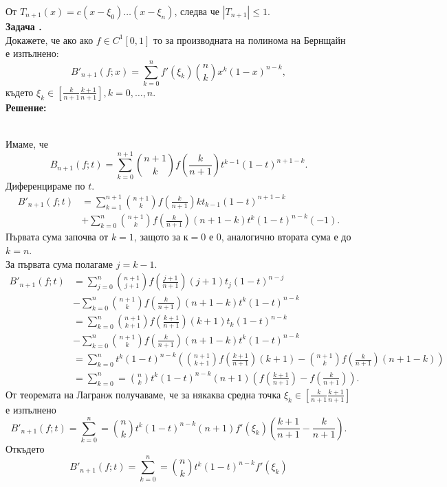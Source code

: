 \documentclass[12pt]{article}
\newcounter{problem}
\newcounter{solution}
\newcommand\problem{%
  \stepcounter{problem}%
  \textbf{Задача \theproblem.}~%
  \\
}
\newcommand\solution{%
  \textbf{Решение:}\\~%
}
\begin{document}
От $T_{n+1}(x)=c(x-\xi_0)\ldots(x-\xi_n)$, следва че $|T_{n+1}|\leq 1$.\\
\problem
Докажете, че ако ако $f\in C^1[0,1]$ то за производната на полинома на Бернщайн е изпълнено:
\begin{equation*}
B'_{n+1}(f;x)=\sum_{k=0}^{n}f'(\xi_k){n\choose k}x^k(1-x)^{n-k},
\end{equation*}
където $\xi_k\in\left[\frac{k}{n+1}\frac{k+1}{n+1}\right], k=0,\ldots,n$.\\
\solution
Имаме, че 
\begin{equation*}
B_{n+1}(f;t)=\sum_{k=0}^{n+1}{n+1 \choose k} f\left(\frac{k}{n+1}\right)  t^{k-1}(1-t)^{n+1-k}.
\end{equation*}
Диференцираме по $t$.
\begin{align*}
B'_{n+1}(f;t) &= \sum_{k=1}^{n+1}{n+1 \choose k} f\left(\frac{k}{n+1}\right)kt_{k-1}(1-t)^{n+1-k} \\&+ \sum_{k=0}^{n}{n+1 \choose k} f\left(\frac{k}{n+1}\right)(n+1-k)t^k(1-t)^{n-k}(-1).
\end{align*}
Първата сума започва от $k=1$, защото за $к=0$ е 0, аналогично втората сума е до $k=n$.\\
За първата сума полагаме $j = k-1$.
\begin{align*}
B'_{n+1}(f;t) &= \sum_{j=0}^{n}{n+1 \choose j+1} f\left(\frac{j+1}{n+1}\right)(j+1)t_{j}(1-t)^{n-j} \\&- \sum_{k=0}^{n}{n+1 \choose k} f\left(\frac{k}{n+1}\right)(n+1-k)t^k(1-t)^{n-k} \\&=\sum_{k=0}^{n}{n+1 \choose k+1} f\left(\frac{k+1}{n+1}\right)(k+1)t_{k}(1-t)^{n-k} \\&- \sum_{k=0}^{n}{n+1 \choose k} f\left(\frac{k}{n+1}\right)(n+1-k)t^k(1-t)^{n-k} \\&=\sum_{k=0}^{n}t^k(1-t)^{n-k}\left({n+1 \choose k+1} f\left(\frac{k+1}{n+1}\right)(k+1)-{n+1 \choose k} f\left(\frac{k}{n+1}\right)(n+1-k)\right)\\&=\sum_{k=0}^n={n \choose k} t^k (1-t)^{n-k} (n+1)\left(f\left(\frac{k+1}{n+1}\right)-f\left(\frac{k}{n+1}\right)\right).
\end{align*}
От теоремата на Лагранж получаваме, че за някаква средна точка $\xi_k\in\left[\frac{k}{n+1}\frac{k+1}{n+1}\right]$ е изпълнено
\begin{equation*}
B'_{n+1}(f;t)=\sum_{k=0}^n={n \choose k} t^k (1-t)^{n-k} (n+1)f'(\xi_k)\left(\frac{k+1}{n+1}-\frac{k}{n+1}\right).
\end{equation*}
Откъдето
\begin{equation*}
B'_{n+1}(f;t)=\sum_{k=0}^n={n \choose k} t^k (1-t)^{n-k}f'(\xi_k)
\end{equation*}
\end{document}
